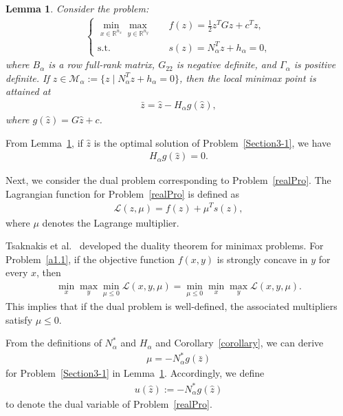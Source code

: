 \documentclass{article}
\newtheorem{lemma}{Lemma}
\begin{document}
	\begin{lemma}\label{lemma equality}
		Consider the problem:
		\begin{align}\label{Section3-1}
			\left\lbrace
			\begin{aligned}
				\min_{x \in \mathbb{R}^{n_x}} \max_{y \in \mathbb{R}^{n_y}} \quad & f(z) = \tfrac{1}{2} z^{T} G z + c^{T} z, \\
				\text{s.t.} \quad & s(z) = N_{\alpha}^{T} z + h_{\alpha} = 0,
			\end{aligned}
			\right.
		\end{align}
		where $B_{\alpha}$ is a row full-rank matrix, $G_{22}$ is negative definite, and $\Gamma_{\alpha}$ is positive definite.  
		If $\hat{z} \in \mathcal{M}_{\alpha} := \{ z \mid N_{\alpha}^{T} z + h_{\alpha} = 0 \}$, then the local minimax point is attained at
		\begin{align*}
		\bar{z} = \hat{z} - H_{\alpha} g(\hat{z}),
		\end{align*}
		where $g(\hat{z}) = G \hat{z} + c$.
	\end{lemma}
	
	From Lemma~\ref{lemma equality}, if $\hat{z}$ is the optimal solution of Problem~\eqref{Section3-1}, we have
	\begin{align*}
		H_{\alpha} g(\hat{z}) = 0. \label{Halpha_condition}
	\end{align*}
	
	Next, we consider the dual problem corresponding to Problem~\eqref{realPro}.  
	The Lagrangian function for Problem~\eqref{realPro} is defined as
	\begin{align}
		\mathcal{L}(z, \mu) = f(z) + \mu^{T} s(z),
	\end{align}
	where $\mu$ denotes the Lagrange multiplier.
	
	Tsaknakis et al.~\cite{tsaknakisMinimaxProblemsCoupled2023} developed the duality theorem for minimax problems.  
	For Problem~\eqref{a1.1}, if the objective function $f(x, y)$ is strongly concave in $y$ for every $x$, then
	\begin{align}
		\min_{x} \max_{y} \min_{\mu \leq 0} \mathcal{L}(x, y, \mu)
		= \min_{\mu \leq 0} \min_{x} \max_{y} \mathcal{L}(x, y, \mu).
	\end{align}
	This implies that if the dual problem is well-defined, the associated multipliers satisfy $\mu \leq 0$.
	
	From the definitions of $N_{\alpha}^{\ast}$ and $H_{\alpha}$ and Corollary~\ref{corollary}, we can derive
	\begin{align*}
		\mu = - N_{\alpha}^{\ast} g(\bar{z})
	\end{align*}
	for Problem~\eqref{Section3-1} in Lemma~\ref{lemma equality}.  
	Accordingly, we define
	\begin{align*}
		u(\hat{z}) := - N_{\alpha}^{\ast} g(\hat{z})
	\end{align*}
	to denote the dual variable of Problem~\eqref{realPro}.  
	
\end{document}

